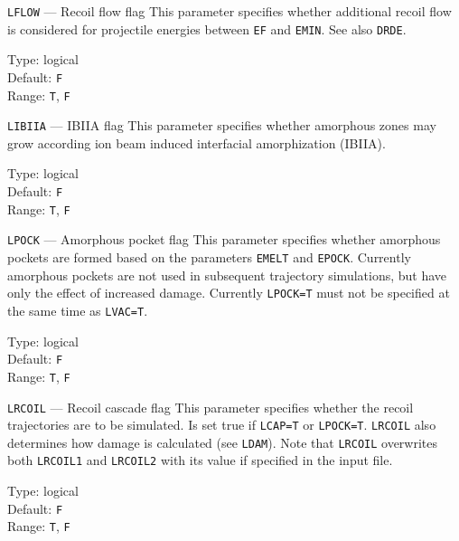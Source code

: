 \begin{keydescription}{\texttt{LFLOW} --- Recoil flow flag}
%
  This parameter specifies whether additional recoil flow is considered for
  projectile energies between \texttt{EF} and \texttt{EMIN}. See also 
  \texttt{DRDE}.
  \begin{keytab}
    Type:    \> logical \\
    Default: \> \texttt{F} \\
    Range:   \> \texttt{T}, \texttt{F}
  \end{keytab}
\end{keydescription}
\fi

\begin{keydescription}{\texttt{LIBIIA} --- IBIIA flag}
%
  This parameter specifies whether amorphous zones may grow according
  ion beam induced interfacial amorphization (IBIIA).
  \begin{keytab}
    Type:    \> logical \\
    Default: \> \texttt{F} \\
    Range:   \> \texttt{T}, \texttt{F}
  \end{keytab}
\end{keydescription}

\begin{keydescription}{\texttt{LPOCK} --- Amorphous pocket flag}
%
  This parameter specifies whether amorphous pockets are formed based on
  the parameters \texttt{EMELT} and \texttt{EPOCK}. Currently amorphous
  pockets are not used in subsequent trajectory simulations, but have
  only the effect of increased damage. Currently \texttt{LPOCK=T} must not
  be specified at the same time as \texttt{LVAC=T}.
  \begin{keytab}
    Type:    \> logical \\
    Default: \> \texttt{F} \\
    Range:   \> \texttt{T}, \texttt{F}
  \end{keytab}
\end{keydescription}

\begin{keydescription}{\texttt{LRCOIL} --- Recoil cascade flag}
%
  This parameter specifies whether the recoil trajectories are to be
  simulated. Is set true if \texttt{LCAP=T} or \texttt{LPOCK=T}. \texttt{LRCOIL}
  also determines how damage is calculated (see \texttt{LDAM}). Note that
  \texttt{LRCOIL} overwrites both \texttt{LRCOIL1} and \texttt{LRCOIL2} with its
  value if specified in the input file.
  \begin{keytab}
    Type:    \> logical \\
    Default: \> \texttt{F} \\
    Range:   \> \texttt{T}, \texttt{F}
  \end{keytab}
\end{keydescription}

